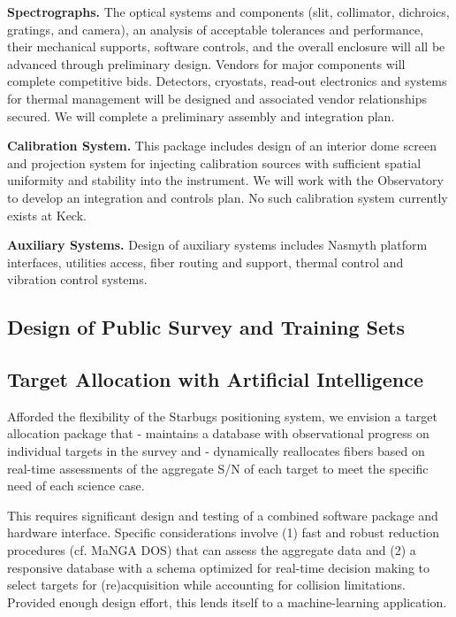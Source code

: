 \documentclass[oneside,11pt]{amsart}
\newcommand{\comment}[2][todo]{{\color{#1}[[{\bf #2}]]}}
\begin{document}
\noindent \textbf{Spectrographs.} The optical systems and components (slit, collimator, dichroics, gratings, and camera), an analysis of acceptable tolerances and performance, their mechanical supports, software controls, and the overall enclosure will all be advanced through preliminary design.  Vendors for major components will complete competitive bids.  Detectors, cryostats, read-out electronics and systems for thermal management will be designed and associated vendor relationships secured. We will complete a preliminary assembly and integration plan.

\noindent \textbf{Calibration System.} This package includes design of an interior dome screen and projection system for injecting calibration sources with sufficient spatial uniformity and stability into the instrument.  We will work with the Observatory to develop an integration and controls plan.  No such calibration system currently exists at Keck.

\noindent \textbf{Auxiliary Systems.} Design of auxiliary systems includes Nasmyth platform interfaces, utilities access, fiber routing and support, thermal control and vibration control systems.


\subsection{Design of Public Survey and Training Sets}
\label{sec:survey}
\noindent \comment{1 page}



\subsection{Target Allocation with Artificial Intelligence}
\label{sec:targeting}
\noindent \comment{1/2 page}


Afforded the flexibility of the Starbugs positioning system, we envision
a target allocation package that
    - maintains a database with observational progress on individual
      targets in the survey and
    - dynamically reallocates fibers based on real-time assessments of
      the aggregate S/N of each target to meet the specific need of each
      science case.

This requires significant design and testing of a combined software
package and hardware interface.  Specific considerations involve (1)
fast and robust reduction procedures (cf. MaNGA DOS) that can assess the
aggregate data and (2) a responsive database with a schema optimized for
real-time decision making to select targets for (re)acquisition while
accounting for collision limitations.  Provided enough design effort,
this lends itself to a machine-learning application.
\end{document}
